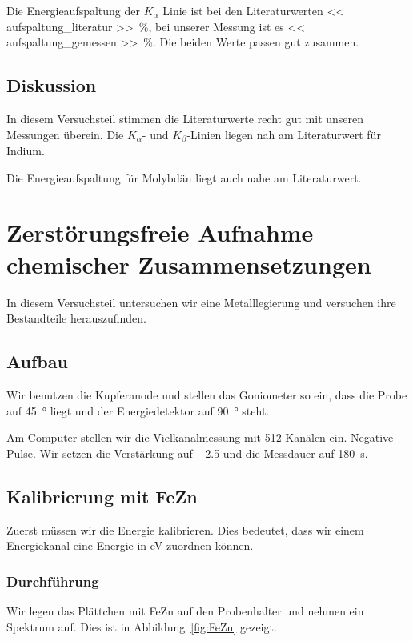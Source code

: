 Die Energieaufspaltung der $K_\alpha$ Linie ist bei den Literaturwerten \SI{<<
aufspaltung_literatur >>}{\percent}, bei unserer Messung ist es \SI{<<
aufspaltung_gemessen >>}{\percent}. Die beiden Werte passen gut zusammen.

\section{Diskussion}

In diesem Versuchsteil stimmen die Literaturwerte recht gut mit unseren
Messungen überein. Die $K_\alpha$- und $K_\beta$-Linien liegen nah am
Literaturwert für Indium.

Die Energieaufspaltung für Molybdän liegt auch nahe am Literaturwert.

\chapter{Zerstörungsfreie Aufnahme chemischer Zusammensetzungen}

In diesem Versuchsteil untersuchen wir eine Metalllegierung und versuchen ihre
Bestandteile herauszufinden.

\section{Aufbau}

Wir benutzen die Kupferanode und stellen das Goniometer so ein, dass die Probe
auf \SI{45}{\degree} liegt und der Energiedetektor auf \SI{90}{\degree} steht.

Am Computer stellen wir die Vielkanalmessung mit 512 Kanälen ein. Negative
Pulse. Wir setzen die Verstärkung auf \num{-2.5} und die Messdauer auf
\SI{180}{\second}.

\section{Kalibrierung mit FeZn}

Zuerst müssen wir die Energie kalibrieren. Dies bedeutet, dass wir einem
Energiekanal eine Energie in \si{\electronvolt} zuordnen können.

\subsection{Durchführung}

Wir legen das Plättchen mit FeZn auf den Probenhalter und nehmen ein Spektrum
auf. Dies ist in Abbildung~\ref{fig:FeZn} gezeigt.

